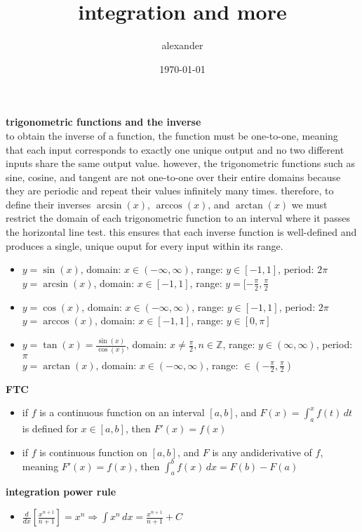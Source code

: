 \documentclass{article}
\title{integration and more}
\author{alexander}
\date{\today}
\begin{document}
\maketitle

\textbf{trigonometric functions and the inverse}\\
to obtain the inverse of a function, the function must be one-to-one, meaning that each input corresponds to exactly one unique output and no two different inputs share the same output value. however, the trigonometric functions such as sine, cosine, and tangent are not one-to-one over their entire domains because they are periodic and repeat their values infinitely many times. therefore, to define their inverses $\arcsin(x)$, $\arccos(x)$, and $\arctan(x)$ we must restrict the domain of each trigonometric function to an interval where it passes the horizontal line test. this ensures that each inverse function is well-defined and produces a single, unique ouput for every input within its range.	
	\begin{itemize}
		\item $y = \sin(x)$, domain: $x \in (-\infty, \infty)$, range: $y \in [-1, 1]$, period: $2\pi$\\
			$y = \arcsin(x)$, domain: $x \in [-1, 1]$, range: $y = [-\frac{\pi}{2}, \frac{\pi}{2}$
		\item $y = \cos(x)$, domain: $x \in (-\infty, \infty)$, range: $y \in [-1, 1]$, period: $2\pi$\\
			$y = \arccos(x)$, domain: $x \in [-1, 1]$, range: $y \in [0, \pi]$
		\item $y = \tan(x) = \frac{\sin(x)}{\cos(x)}$, domain: $x \neq \frac{\pi}{2}, n \in \mathbb{Z}$, range: $y \in (\infty, \infty)$, period: $\pi$\\
			$y = \arctan(x)$, domain: $x \in (-\infty, \infty)$, range: $\in (-\frac{\pi}{2}, \frac{\pi}{2})$
	\end{itemize}	

\textbf{FTC}
	\begin{itemize}
		\item if $f$ is a continuous function on an interval $[a, b]$, and $F(x) = \int_{a}^{x}f(t)\,dt$ is defined for $x \in [a, b]$, then $F'(x) = f(x)$
		\item if $f$ is continuous function on $[a, b]$, and $F$ is any andiderivative of $f$, meaning $F'(x) = f(x)$, then $\int_{a}^{b}f(x)\,dx = F(b) - F(a)$
	\end{itemize}

\textbf{integration power rule}
        \begin{itemize}
                \item $\frac{d}{dx}[\frac{x^{n+1}}{n+1}] = x^n \Rightarrow \int x^n\,dx = \frac{x^{n+1}}{n+1} + C$
        \end{itemize}
                
\end{document}

